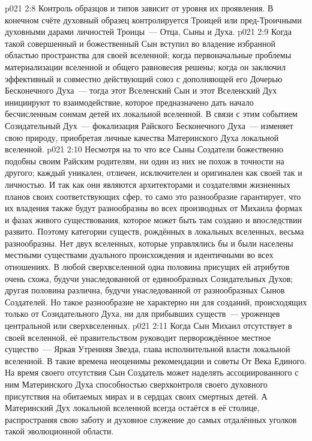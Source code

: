 \vs p021 2:8 \pc Контроль образцов и типов  зависит от уровня их проявления. В конечном счёте духовный образец контролируется Троицей или пред\hyp{}Троичными духовными дарами личностей Троицы~--- Отца, Сыны и Духа.
\vs p021 2:9 \pc Когда такой совершенный и божественный Сын вступил во владение избранной областью пространства для своей вселенной; когда первоначальные проблемы материализации вселенной и общего равновесия решены; когда он заключил эффективный и совместно действующий союз с дополняющей его Дочерью Бесконечного Духа~--- тогда этот Вселенский Сын и этот Вселенский Дух инициируют то взаимодействие, которое предназначено дать начало бесчисленным сонмам детей их локальной вселенной. В связи с этим событием Созидательный Дух~--- фокализация Райского Бесконечного Духа~--- изменяет свою природу, приобретая личные качества Материнского Духа локальной вселенной.
\vs p021 2:10 Несмотря на то что все Сыны Создатели божественно подобны своим Райским родителям, ни один из них не похож в точности на другого; каждый уникален, отличен, исключителен и оригинален как своей  так и личностью. И так как они являются архитекторами и создателями жизненных планов своих соответствующих сфер, то само это разнообразие гарантирует, что их владения также будут разнообразны во всех производных от Михаила формах и фазах живого существования, которое может быть там создано и впоследствии развито. Поэтому категории существ, рождённых в локальных вселенных, весьма разнообразны. Нет двух вселенных, которые управлялись бы и были населены местными существами дуального происхождения и идентичными во всех отношениях. В любой сверхвселенной одна половина присущих ей атрибутов очень схожа, будучи унаследованной от единообразных Созидательных Духов; другая половина различна, будучи унаследованной от разнообразных Сынов Создателей. Но такое разнообразие не характерно ни для созданий, происходящих только от Созидательного Духа, ни для прибывших существ~--- уроженцев центральной или сверхвселенных.
\vs p021 2:11 \pc Когда Сын Михаил отсутствует в своей вселенной, её правительством руководит перворождённое местное существо~--- Яркая Утренняя Звезда, глава исполнительной власти локальной вселенной. В такие времена неоценимы рекомендации и советы От Века Единого. На время своего отсутствия Сын Создатель может наделять ассоциированного с ним Материнского Духа способностью сверхконтроля своего духовного присутствия на обитаемых мирах и в сердцах своих смертных детей. А Материнский Дух локальной вселенной всегда остаётся в её столице, распространяя свою заботу и духовное служение до самых отдалённых уголков такой эволюционной области.
